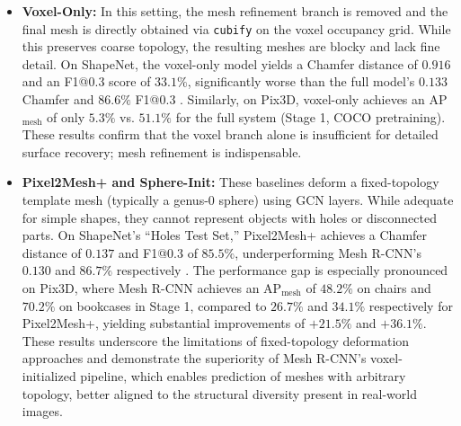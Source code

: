 \begin{itemize}
    
    \item \textbf{Voxel-Only:} In this setting, the mesh refinement branch is removed and the final mesh is directly obtained via \texttt{cubify} on the voxel occupancy grid. While this preserves coarse topology, the resulting meshes are blocky and lack fine detail. On ShapeNet, the voxel-only model yields a Chamfer distance of \( \mathbf{0.916} \) and an F1@0.3 score of \( \mathbf{33.1\%} \), significantly worse than the full model’s \( \mathbf{0.133} \) Chamfer and \( \mathbf{86.6\%} \) F1@0.3 \cite[Table 2]{gkioxari2020_meshrcnn}. Similarly, on Pix3D, voxel-only achieves an AP$_\text{mesh}$ of only \( \mathbf{5.3\%} \) vs. \( \mathbf{51.1\%} \) for the full system (Stage 1, COCO pretraining). These results confirm that the voxel branch alone is insufficient for detailed surface recovery; mesh refinement is indispensable.
    
    \item \textbf{Pixel2Mesh+ and Sphere-Init:} These baselines deform a fixed-topology template mesh (typically a genus-0 sphere) using GCN layers. While adequate for simple shapes, they cannot represent objects with holes or disconnected parts. On ShapeNet’s ``Holes Test Set,'' Pixel2Mesh+ achieves a Chamfer distance of \( \mathbf{0.137} \) and F1@0.3 of \( \mathbf{85.5\%} \), underperforming Mesh R-CNN’s \( \mathbf{0.130} \) and \( \mathbf{86.7\%} \) respectively \cite[Table 2]{gkioxari2020_meshrcnn}. The performance gap is especially pronounced on Pix3D, where Mesh R-CNN achieves an AP$_\text{mesh}$ of \(48.2\%\) on chairs and \(70.2\%\) on bookcases in Stage 1, compared to \(26.7\%\) and \(34.1\%\) respectively for Pixel2Mesh+, yielding substantial improvements of \(+21.5\%\) and \(+36.1\%\). These results underscore the limitations of fixed-topology deformation approaches and demonstrate the superiority of Mesh R-CNN’s voxel-initialized pipeline, which enables prediction of meshes with arbitrary topology, better aligned to the structural diversity present in real-world images.
    
    \newpage
    

\end{itemize}
